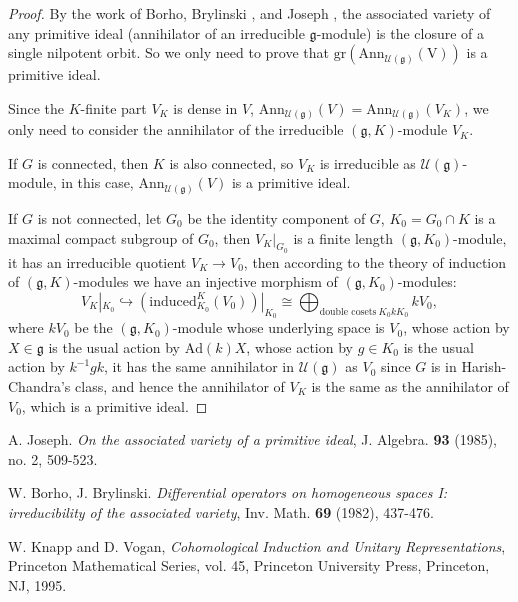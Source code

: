 \documentclass[12pt]{amsart}
\numberwithin{equation}{section}
\newcommand{\CU}{{\mathcal {U}}}
\newcommand{\Ann}{{\mathrm{Ann}}}
\newcommand{\fg}{\mathfrak{g}}
\newcommand{\Ad}{{\mathrm{Ad}}}
\begin{document}
\begin{proof}
  By the work of Borho, Brylinski \cite{BB}, and Joseph \cite{Jos}, the associated variety of any primitive ideal (annihilator of an irreducible $\fg$-module) is the closure of a single nilpotent orbit. So we only need to prove that $\mathrm{gr}(\mathrm{Ann_{\CU(\fg)}(V)})$ is a primitive ideal.

  Since the $K$-finite part $V_K$ is dense in $V$, $\Ann_{\CU(\fg)}(V) = \Ann_{\CU(\fg)}(V_K)$, we only need to consider the annihilator of the irreducible $(\fg,K)$-module $V_K$.

  If $G$ is connected, then $K$ is also connected, so $V_K$ is irreducible as $\CU(\fg)$-module, in this case, $\Ann_{\CU(\fg)}(V)$ is a primitive ideal.

  If $G$ is not connected, let $G_0$ be the identity component of $G$, $K_0 = G_0 \cap K$ is a maximal compact subgroup of $G_0$, then $V_K|_{G_0}$ is a finite length $(\fg,K_0)$-module, it has an irreducible quotient $V_K \to V_0$, then according to the theory of induction of $(\fg,K)$-modules \cite[Chapter 2]{KV} we have an injective morphism of $(\fg,K_0)$-modules:
  \begin{equation}
     V_K|_{K_0} \hookrightarrow  (\mathrm{induced}_{K_0}^{K}(V_0))|_{K_0} \cong \bigoplus_{\textrm{double cosets} \ K_0 k K_0} kV_0,
  \end{equation}
  where $kV_0$ be the $(\fg,K_0)$-module whose underlying space is $V_0$, whose action by $X \in \fg$ is the usual action by $\Ad(k)X$, whose action by $g \in K_0$ is the usual action by $k^{-1}gk$, it has the same annihilator in $\CU(\fg)$ as $V_0$ since $G$ is in Harish-Chandra's class, and hence the annihilator of $V_K$ is the same as the annihilator of $V_0$, which is a primitive ideal.

\end{proof}


\begin{thebibliography}{99}


      A. Joseph. \textit{On the associated variety of a primitive ideal}, J. Algebra. \textbf{93} (1985), no. 2, 509-523.


      W. Borho, J. Brylinski. \textit{Differential operators on homogeneous spaces I: irreducibility of the associated variety}, Inv. Math. \textbf{69} (1982), 437-476.

      W. Knapp and D. Vogan, \textit{Cohomological Induction and Unitary Representations}, Princeton Mathematical Series, vol. 45, Princeton University Press, Princeton, NJ, 1995.



\end{thebibliography}
\end{document}
